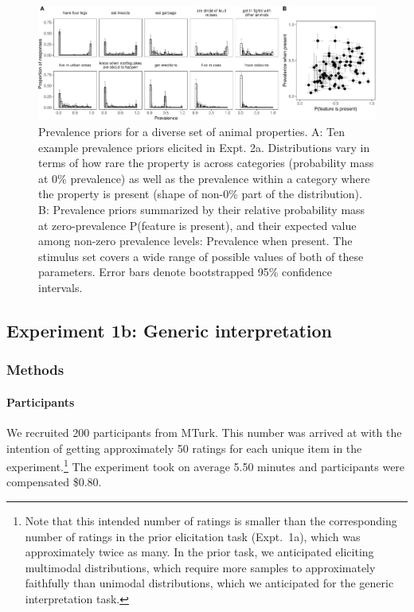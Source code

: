 \documentclass[floatsintext,doc]{apa6}
\let\oldparagraph\paragraph
\renewcommand{\paragraph}[1]{\oldparagraph{#1}\mbox{}}
\let\rmarkdownfootnote\footnote%
\def\footnote{\protect\rmarkdownfootnote}
\begin{document}
\begin{figure}
\centering
\includegraphics{genint_files/figure-latex/genInt-prevPrior-1.pdf}
\caption{\label{fig:genInt-prevPrior}Prevalence priors for a diverse set of animal properties. A: Ten example prevalence priors elicited in Expt. 2a. Distributions vary in terms of how rare the property is across categories (probability mass at 0\% prevalence) as well as the prevalence within a category where the property is present (shape of non-0\% part of the distribution). B: Prevalence priors summarized by their relative probability mass at zero-prevalence P(feature is present), and their expected value among non-zero prevalence levels: Prevalence when present. The stimulus set covers a wide range of possible values of both of these parameters. Error bars denote bootstrapped 95\% confidence intervals.}
\end{figure}

\hypertarget{experiment-1b-generic-interpretation}{%
\subsection{Experiment 1b: Generic interpretation}\label{experiment-1b-generic-interpretation}}

\hypertarget{methods-1}{%
\subsubsection{Methods}\label{methods-1}}

\hypertarget{participants-2}{%
\paragraph{Participants}\label{participants-2}}
%
We recruited 200 participants from MTurk.
This number was arrived at with the intention of getting approximately 50 ratings for each unique item in the experiment.\footnote{Note that this intended number of ratings is smaller than the corresponding number of ratings in the prior elicitation task (Expt.~1a), which was approximately twice as many. In the prior task, we anticipated eliciting multimodal distributions, which require more samples  to approximately faithfully than unimodal distributions, which we anticipated for the generic interpretation task.}
The experiment took on average 5.50 minutes and participants were compensated \$0.80.
\end{document}
